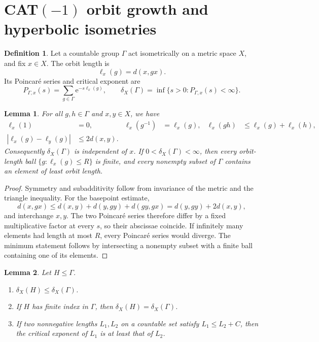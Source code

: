 \documentclass[11pt]{article}
\newtheorem{lemma}[lemma]{Lemma}
\theoremstyle{definition}
\newtheorem{definition}[definition]{Definition}
\newcommand{\e}{\mathrm e}
\begin{document}
\section{\texorpdfstring{CAT$(-1)$}{CAT(-1)} orbit growth and hyperbolic isometries}
\label{sec:cat-geometry}

\begin{definition}
Let a countable group $\Gamma$ act isometrically on a metric space $X$, and fix $x\in X$.
The orbit length is
\[
 \ell_x(g)=d(x,gx).
\]
Its Poincar\'e series and critical exponent are
\[
 P_{\Gamma,x}(s)=\sum_{g\in\Gamma}\e^{-s\ell_x(g)},
 \qquad
 \delta_X(\Gamma)=\inf\{s>0:P_{\Gamma,x}(s)<\infty\}.
\]
\end{definition}

\begin{lemma}
\label{lem:orbit-basic}
For all $g,h\in\Gamma$ and $x,y\in X$, we have
\begin{align*}
 \ell_x(1)&=0, & \ell_x(g^{-1})&=\ell_x(g),
 & \ell_x(gh)&\le\ell_x(g)+\ell_x(h),\\
 |\ell_x(g)-\ell_y(g)|&\le2d(x,y).
\end{align*}
Consequently $\delta_X(\Gamma)$ is independent of $x$.  If
$0<\delta_X(\Gamma)<\infty$, then every orbit-length ball
$\{g:\ell_x(g)\le R\}$ is finite, and every nonempty subset of $\Gamma$ contains an element
of least orbit length.
\end{lemma}

\begin{proof}
Symmetry and subadditivity follow from invariance of the metric and the triangle inequality.
For the basepoint estimate,
\[
 d(x,gx)\le d(x,y)+d(y,gy)+d(gy,gx)=d(y,gy)+2d(x,y),
\]
and interchange $x,y$.  The two Poincar\'e series therefore differ by a fixed multiplicative
factor at every $s$, so their abscissae coincide.  If infinitely many elements had length at
most $R$, every Poincar\'e series would diverge.  The minimum statement follows by
intersecting a nonempty subset with a finite ball containing one of its elements.
\end{proof}

\begin{lemma}
\label{lem:subgroup-finite-index}
Let $H\le\Gamma$.
\begin{enumerate}[label=\textup{(\roman*)}]
\item $\delta_X(H)\le\delta_X(\Gamma)$.
\item If $H$ has finite index in $\Gamma$, then $\delta_X(H)=\delta_X(\Gamma)$.
\item If two nonnegative lengths $L_1,L_2$ on a countable set satisfy
$L_1\le L_2+C$, then the critical exponent of $L_1$ is at least that of $L_2$.
\end{enumerate}
\end{lemma}
\end{document}
